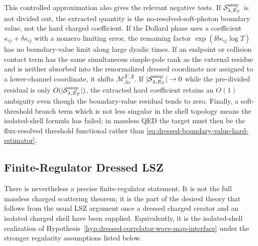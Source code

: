 \begin{controlledapproximation}
This controlled approximation also gives the relevant negative tests.  If
\(\mathcal S_{\lambda,E_T}^{\rm amp}\) is not divided out, the extracted
quantity is the no-resolved-soft-photon boundary value, not the hard charged
coefficient.  If the Dollard phase uses a coefficient
\(\kappa_{ij}+\delta\kappa_{ij}\) with a nonzero limiting error, the
remaining factor \(\exp(\ii\delta\kappa_{ij}\log T)\) has no boundary-value
limit along large dyadic times.  If an endpoint or collision contact term has
the same simultaneous simple-pole rank as the external residue and is neither
absorbed into the renormalized dressed coordinate nor assigned to a
lower-channel coordinate, it shifts
\(\mathcal M_{\beta\alpha}^{\mathfrak F',\mathfrak F}\).  If
\(|\mathcal S_{\lambda,E_T}^{\rm amp}|\to0\) while the pre-divided residual is
only \(O(|\mathcal S_{\lambda,E_T}^{\rm amp}|)\), the extracted hard
coefficient retains an \(O(1)\) ambiguity even though the boundary-value
residual tends to zero.  Finally, a
soft-threshold branch term which is not less singular in the shell topology
means the isolated-shell formula has failed; in massless QED the target must
then be the flux-resolved threshold functional rather than
\eqref{eq:dressed-boundary-value-hard-estimator}.
\end{controlledapproximation}

\subsection{Finite-Regulator Dressed LSZ}

There is nevertheless a precise finite-regulator statement.  It is not the
full massless charged scattering theorem; it is the part of the desired theory
that follows from the usual LSZ argument once a dressed charged creator and an
isolated charged shell have been supplied.  Equivalently, it is the
isolated-shell realization of
Hypothesis~\ref{hyp:dressed-correlator-wave-map-interface} under the stronger
regularity assumptions listed below.

